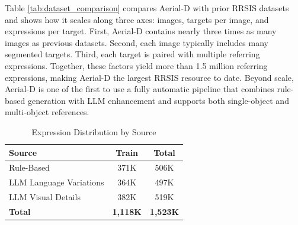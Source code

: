 Table \ref{tab:dataset_comparison} compares Aerial-D with prior RRSIS datasets and shows how it scales along three axes: images, targets per image, and expressions per target. First, Aerial-D contains nearly three times as many images as previous datasets. Second, each image typically includes many segmented targets. Third, each target is paired with multiple referring expressions. Together, these factors yield more than 1.5 million referring expressions, making Aerial-D the largest RRSIS resource to date. Beyond scale, Aerial-D is one of the first to use a fully automatic pipeline that combines rule-based generation with LLM enhancement and supports both single-object and multi-object references.

\begin{table}[t]
\centering
\caption{Comparison with Existing RRSIS Datasets}
\label{tab:dataset_comparison}
\end{table}

\begin{table}[H]
\centering
\caption{Expression Distribution by Source}
\label{tab:llm_enhancement_stats}
\footnotesize
\begin{tabular}{@{}lcc@{}}
\toprule
\textbf{Source} & \textbf{Train} & \textbf{Total} \\
\midrule
Rule-Based & 371K & 506K \\
LLM Language Variations & 364K & 497K \\
LLM Visual Details & 382K & 519K \\
\midrule
\textbf{Total} & \textbf{1,118K} & \textbf{1,523K} \\
\bottomrule
\end{tabular}
\end{table}

